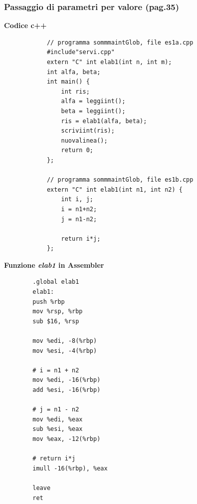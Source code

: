 \subsubsection{Passaggio di parametri per valore (pag.35)}
\begin{framed}
	\noindent \textbf{Codice c++}
	\begin{multicols}{2}
		\begin{verbatim}
			// programma sommmaintGlob, file es1a.cpp
			#include"servi.cpp"
			extern "C" int elab1(int n, int m);
			int alfa, beta;
			int main() { 
				int ris;
				alfa = leggiint(); 
				beta = leggiint();
				ris = elab1(alfa, beta);
				scriviint(ris); 
				nuovalinea();
				return 0;
			};
			
			// programma sommmaintGlob, file es1b.cpp
			extern "C" int elab1(int n1, int n2) { 
				int i, j;
				i = n1+n2;
				j = n1-n2;
				
				return i*j;
			};
		\end{verbatim}
\end{multicols}\end{framed}
\noindent \textbf{Funzione \emph{elab1} in Assembler}
\begin{multicols}{2}
	\begin{verbatim}
		.global elab1
		elab1:
		push %rbp
		mov %rsp, %rbp
		sub $16, %rsp
		
		mov %edi, -8(%rbp)
		mov %esi, -4(%rbp)
		
		# i = n1 + n2
		mov %edi, -16(%rbp)
		add %esi, -16(%rbp)
		
		# j = n1 - n2
		mov %edi, %eax
		sub %esi, %eax
		mov %eax, -12(%rbp)
		
		# return i*j
		imull -16(%rbp), %eax
		
		leave   
		ret
	\end{verbatim}
\end{multicols}

